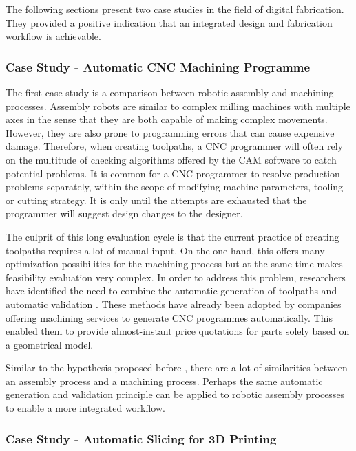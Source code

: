 The following sections present two case studies in the field of digital fabrication. They provided a positive indication that an integrated design and fabrication workflow is achievable.

\subsubsection{Case Study - Automatic CNC Machining Programme}
\label{subsubsection:introduction_case_study_automatic_cnc_machining_programme}

The first case study is a comparison between robotic assembly and machining processes. Assembly robots are similar to complex milling machines with multiple axes in the sense that they are both capable of making complex movements. However, they are also prone to programming errors that can cause expensive damage. Therefore, when creating toolpaths, a CNC programmer will often rely on the multitude of checking algorithms offered by the CAM software to catch potential problems. It is common for a CNC programmer to resolve production problems separately, within the scope of modifying machine parameters, tooling or cutting strategy. It is only until the attempts are exhausted that the programmer will suggest design changes to the designer. 

The culprit of this long evaluation cycle is that the current practice of creating toolpaths requires a lot of manual input. On the one hand, this offers many optimization possibilities for the machining process but at the same time makes feasibility evaluation very complex. In order to address this problem, researchers have identified the need to combine the automatic generation of toolpaths and automatic validation \parencite{garciaProcessPlanningBased2011,sheenMachiningFeatureRecognition2006, joshiGraphbasedHeuristicsRecognition1988}. These methods have already been adopted by companies offering machining services to generate CNC programmes automatically. This enabled them to provide almost-instant price quotations for parts solely based on a geometrical model. 

Similar to the hypothesis proposed before , there are a lot of similarities between an assembly process and a machining process. Perhaps the same automatic generation and validation principle can be applied to robotic assembly processes to enable a more integrated workflow.


\subsubsection{Case Study - Automatic Slicing for 3D Printing}
\label{subsubsection:introduction_case_study_automatic_slicing_for_3d_printing}

